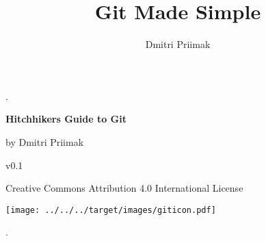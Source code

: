 \documentclass{article}
\title{Git Made Simple}
\author{Dmitri Priimak}
\date{}
\theoremstyle{definition}
\begin{document}
       \newcommand{\segment}[1]{$\overline{#1}$}
       \newcommand{\msegment}[1]{\overline{#1}}
       \thispagestyle{empty}
       \begin{center}
           .

       \vspace{4cm}
       {\Huge \textbf{Hitchhikers Guide to Git}}

               \vspace{6mm}
       {\large by Dmitri Priimak

       v0.1
       }


       Creative Commons Attribution 4.0 International License


               \vspace{2cm}

       \texttt{[image: ../../../target/images/giticon.pdf]}
       \end{center}
       \newpage
       .
       \newpage
       \tableofcontents
       \newpage
       \setcounter{page}{1}
\end{document}
